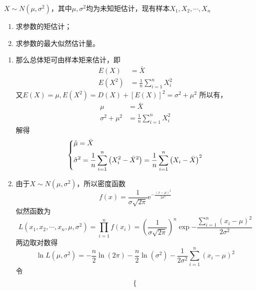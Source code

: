 \begin{example}
    $X\sim N(\mu,\sigma^2)$，其中$\mu,\sigma^2$均为未知矩估计，现有样本$X_1,X_2,\cdots,X_n$
    \begin{enumerate}[(1)]
        \item 求参数的矩估计；
        \item 求参数的最大似然估计量。
    \end{enumerate}
\end{example}
\begin{solution}
    \begin{enumerate}[(1)]
        \item 那么总体矩可由样本矩来估计，即
              \begin{align*}
                  E(X)              & = \bar{X}                       \\
                  E\left(X^2\right) & = \frac{1}{n}\sum_{i=1}^n X_i^2
              \end{align*}
              又$E(X) = \mu, E\left(X^2\right) = D(X)+\left[E(X)\right]^2 = \sigma^2+\mu^2$
              所以有，
              \begin{align*}
                  \mu              & = \bar{X}                       \\
                  \sigma^2 + \mu^2 & = \frac{1}{n}\sum_{i=1}^n X_i^2
              \end{align*}
              解得
              \[
                  \begin{dcases}
                      \hat{\mu} = \bar{X} \\
                      \hat{\sigma}^2 = \frac{1}{n}\sum_{i=1}^n \left(X_i^2 - \bar{X}^2\right) = \frac{1}{n}\sum_{i=1}^n\left(X_i-\bar{X}\right)^2
                  \end{dcases}
              \]
        \item 由于$X\sim N\left(\mu,\sigma^2\right)$，所以密度函数
              \[
                  f(x) = \frac{1}{\sigma\sqrt{2\pi}}\mathrm{e}^{-\frac{(x-\mu)^2}{2\sigma^2}}
              \]
              似然函数为
              \[
                  L(x_1,x_2,\cdots,x_n,\mu,\sigma^2) = \prod_{i=1}^n f(x_i) = \left(\frac{1}{\sigma\sqrt{2\pi}}\right)^n\exp{-\frac{\sum_{i=1}^n (x_i-\mu)^2}{2\sigma^2}}
              \]
              两边取对数得
              \[
                  \ln L(\mu,\sigma^2) = -\frac{n}{2} \ln (2\pi) - \frac{n}{2}\ln\left(\sigma^2\right) - \frac{1}{2\sigma^2}\sum_{i=1}^n (x_i-\mu)^2
              \]
              令
              \[
                  \begin{dcases}

\end{dcases}\]
\end{enumerate}
\end{solution}

